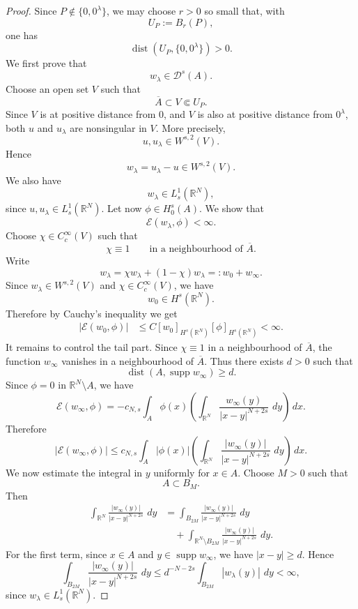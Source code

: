 \documentclass[11pt,a4paper]{article}
\newcommand{\dd}{\,d}
\newcommand{\dist}{\operatorname{dist}}
\newcommand{\supp}{\operatorname{supp}}
\begin{document}
\begin{proof}
Since \(P\notin\{0,0^\lambda\}\), we may choose \(r>0\) so small that, with
\[
U_P:=B_r(P),
\]
one has
\[
\dist(U_P,\{0,0^\lambda\})>0.
\]
We first prove that
\[
w_\lambda\in \mathcal{D}^{s}(A).
\]
Choose an open set \(V\) such that
\[
\overline{A}\subset V\Subset U_P.
\]
Since \(V\) is at positive distance from \(0\), and \(V\) is also at positive
distance from \(0^\lambda\), both \(u\) and \(u_\lambda\) are nonsingular in
\(V\). More precisely,
\[
u,u_{\lambda}\in W^{s,2}(V).
\]
Hence
\[
w_\lambda=u_\lambda-u\in W^{s,2}(V).
\]
We also have
\[
w_\lambda\in L^1_s(\mathbb R^N),
\]
since \(u,u_{\lambda} \in  L^1_s(\mathbb R^N)\).
Let now \(\phi\in H^s_0(A)\). We show that
\[
\mathcal E(w_\lambda,\phi)<\infty.
\]
Choose \(\chi\in C_c^\infty(V)\) such that
\[
\chi\equiv1
\qquad\text{in a neighbourhood of }\overline{A}.
\]
Write
\[
w_\lambda=\chi w_\lambda+(1-\chi)w_\lambda=:w_0+w_\infty.
\]
Since \(w_\lambda\in W^{s,2}(V)\) and \(\chi\in C_c^\infty(V)\), we have
\[
w_0\in H^s(\mathbb R^N).
\]
Therefore by Cauchy's inequality we get
\begin{equation}\label{eq:w0}
\begin{aligned}
|\mathcal E(w_0,\phi)|
&\le
C
[w_0]_{H^s(\mathbb R^N)}
[\phi]_{H^s(\mathbb R^N)}
<\infty .
\end{aligned}
\end{equation}
It remains to control the tail part. Since \(\chi\equiv1\) in a neighbourhood
of \(\overline{A}\), the function \(w_\infty\) vanishes in a
neighbourhood of \(\overline{A}\). Thus there exists \(d>0\) such that
\[
\dist(A,\supp w_\infty)\ge d.
\]
Since \(\phi=0\) in \(\mathbb R^N \setminus A\), we have
\[
\mathcal E(w_\infty,\phi)
=
-c_{N,s}
\int_{A}
\phi(x)
\left(
\int_{\mathbb R^N}
\frac{w_\infty(y)}{|x-y|^{N+2s}}\,\dd y
\right)\dd x.
\]
Therefore
\[
|\mathcal E(w_\infty,\phi)|
\le
c_{N,s}
\int_{A}
|\phi(x)|
\left(
\int_{\mathbb R^N}
\frac{|w_\infty(y)|}{|x-y|^{N+2s}}\,\dd y
\right)\dd x.
\]
We now estimate the integral in \(y\) uniformly for \(x\in A\). Choose
\(M>0\) such that
\[
A\subset B_M.
\]
Then
\[
\begin{aligned}
\int_{\mathbb R^N}
\frac{|w_\infty(y)|}{|x-y|^{N+2s}}\,\dd y
&=
\int_{B_{2M}}
\frac{|w_\infty(y)|}{|x-y|^{N+2s}}\,\dd y  \\
&\quad+
\int_{\mathbb R^N\setminus B_{2M}}
\frac{|w_\infty(y)|}{|x-y|^{N+2s}}\,\dd y.
\end{aligned}
\]
For the first term, since \(x\in A\) and
\(y\in\supp w_\infty\), we have \(|x-y|\ge d\). Hence
\[
\int_{B_{2M}}
\frac{|w_\infty(y)|}{|x-y|^{N+2s}}\,\dd y
\le
d^{-N-2s}
\int_{B_{2M}}|w_\lambda(y)|\,\dd y
<\infty,
\]
since \(w_\lambda\in L^1_s(\mathbb R^N)\).


\end{proof}
\end{document}
